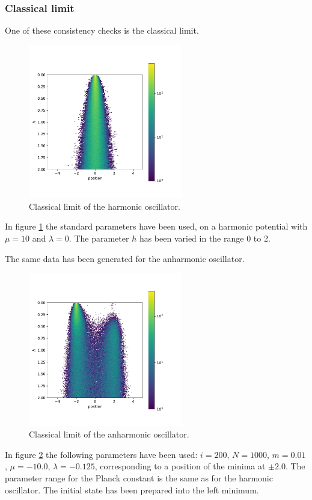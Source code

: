 \documentclass{scrartcl}
\begin{document}
	\subsubsection{Classical limit}
		One of these consistency checks is the classical limit.
		\begin{figure}[H]
			\centering
				\includegraphics[width=0.6\textwidth]{../imgs/harmonic_oscillator_classical_limit/harmonic_oscillator_10_classical_limit.pdf}
			\caption{Classical limit of the harmonic oscillator.}
			\label{fig:harmonic_oscillator_classical_limit}
		\end{figure}
		In figure \ref{fig:harmonic_oscillator_classical_limit} the standard parameters have been used, on a harmonic potential  with $\mu = 10$ and $\lambda = 0$.
		The parameter $\hbar$ has been varied in the range 0 to 2.

		The same data has been generated for the anharmonic oscillator.
		\begin{figure}[H]
			\centering
				\includegraphics[width=0.6\textwidth]{../imgs/anharmonic_oscillator_classical_limit/anharmonic_oscillator_classical_limit.pdf}
			\caption{Classical limit of the anharmonic oscillator.}
			\label{fig:anharmonic_oscillator_classical_limit}
		\end{figure}
		In figure \ref{fig:anharmonic_oscillator_classical_limit} the following parameters have been used: $i = 200$, $N = 1000$, $m = 0.01$, $\mu = -10.0$, $\lambda = -0.125$, corresponding to a position of the minima at $\pm 2.0$.
		The parameter range for the Planck constant is the same as for the harmonic oscillator.
		The initial state has been prepared into the left minimum.
\end{document}
